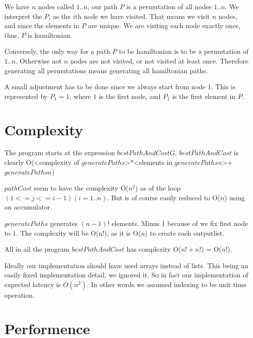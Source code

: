 \documentclass[a4paper,11pt]{article}
\begin{document}
We have $n$ nodes called $1..n$, our path $P$ is a permutation of all nodes $1..n$.
We interpret the $P_i$ as the $i$th node we have visited.
That means we visit $n$ nodes, and since the elements in $P$ are unique.
We are visiting each node exactly once, thus, $P$ is hamiltonian.

Conversely, the only way for a path $P$ to be hamiltonian is to be a permutation of $1..n$.
Otherwise not $n$ nodes are not visited, or not visited at least once.
Therefore generating all permutations means generating all hamiltonian paths.

A small adjustment has to be done since we always start from node $1$.
This is represented by $P_1 = 1$, where $1$ is the first node, and $P_1$ is
the first element in $P$.

\section{Complexity}
The program starts at the expression $bestPathAndCost G$.
$bestPathAndCost$ is clearly
O(<complexity of $generatePaths$>$*$<elements in $generatePaths n$>$+$ $generatePaths n$)

$pathCost$ seem to have the complexity O($n^2$) as of the loop $(1 <= j <= i-1) (i = 1..n)$.
But is of course easily reduced to O($n$) using an accumulator.

$generatePaths$ generates $(n-1)!$ elements. Minus 1 because of we fix first node to $1$. 
The complexity will be O(n!), as it is O($n$) to create each outputlist.

All in all the program $bestPathAndCost$ has complexity O($n!+n!$) = O($n!$).

Ideally our implementation should have used arrays instead of lists.
This being an easily fixed implementation detail, we ignored it.
So in fact our implementation of expected latency is $O(n^2)$.
In other words we assumed indexing to be unit time operation. 

\section{Performence}
\end{document}
